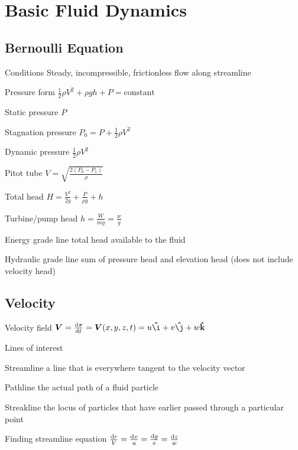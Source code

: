 \documentclass{article}
\begin{document}
\section{Basic Fluid Dynamics}

\subsection{Bernoulli Equation}
\label{sec:bernoulli-eq}
\begin{description*}
\item[Conditions] Steady, incompressible, frictionless flow along streamline
\item[Pressure form]
  \(\frac{1}{2}\rho V^2 + \rho g h + P = \text{constant}\)
\item[Static pressure]
  \(P\)
\item[Stagnation pressure]
  \(P_0 = P + \frac{1}{2}\rho V^2\)
\item[Dynamic pressure]
  \(\frac{1}{2}\rho V^2\)
\item[Pitot tube]
  \(V = \sqrt{\frac{2\left(P_0-P_1\right)}{\rho}}\)
\item[Total head]
  \(H = \frac{V^2}{2g} + \frac{P}{\rho g} + h\)
\item[Turbine\slash{}pump head]
  \(h = \frac{\dot{W}}{\dot{m} g} = \frac{w}{g}\)
\item[Energy grade line] total head available to the fluid
\item[Hydraulic grade line] sum of pressure head and elevation head (does not include velocity head)
\end{description*}

\subsection{Velocity}
\begin{description*}
\item[Velocity field]
  \(\vec{V} = \od{\vec{r}}{t} = \vec{V}(x,y,z,t)
  = u\uvec{\mathrm{\i}}+v\uvec{\mathrm{\j}} + w\uvec{\mathrm{k}}\)
\item[Lines of interest]~
  \begin{description*}
  \item[Streamline] a line that is everywhere tangent to the velocity vector
  \item[Pathline] the actual path of a fluid particle
  \item[Streakline] the locus of particles that have earlier passed through a particular point
  \end{description*}
\item[Finding streamline equation]
  \(\frac{\dif r}{V} = \frac{\dif x}{u} = \frac{\dif y}{v} = \frac{\dif z}{w}\)
\end{description*}
\end{document}
